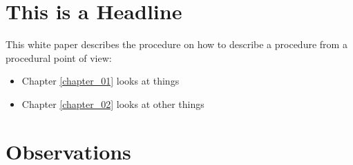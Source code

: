 
\section*{This is a Headline}

This white paper describes the procedure on how to describe a
procedure from a procedural point of view:

\begin{itemize}
  \item Chapter \vref{chapter_01} looks at things
  \item Chapter \vref{chapter_02} looks at other things 
\end{itemize}

\section*{Observations}

\lipsum[7]

